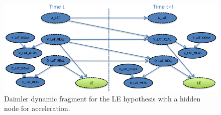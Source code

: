 \begin{figure}
\begin{center}
\includegraphics[scale=0.58]{./figures/DaimlertempDynAccel}
\end{center}
\caption{\label{Figure:tempDynAccel}Daimler dynamic fragment for the LE hypothesis with a hidden node for acceleration.}
\end{figure}